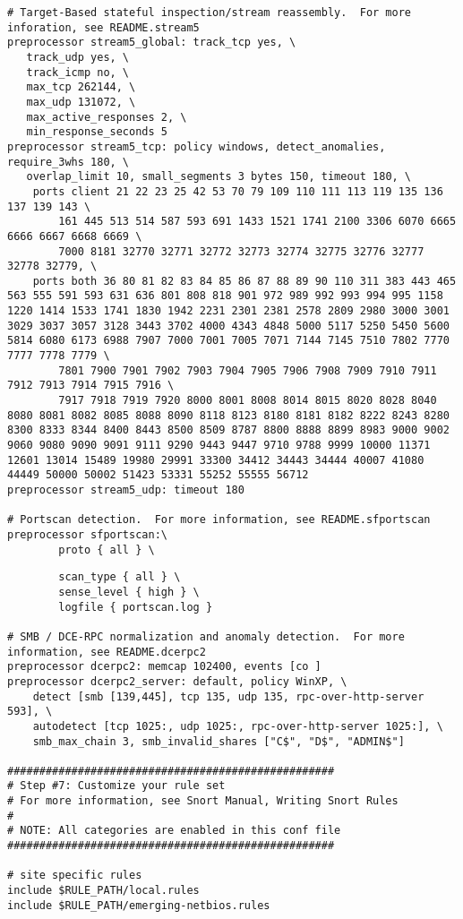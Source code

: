 \begin{lstlisting}
# Target-Based stateful inspection/stream reassembly.  For more inforation, see README.stream5
preprocessor stream5_global: track_tcp yes, \
   track_udp yes, \
   track_icmp no, \ 
   max_tcp 262144, \
   max_udp 131072, \
   max_active_responses 2, \
   min_response_seconds 5
preprocessor stream5_tcp: policy windows, detect_anomalies, require_3whs 180, \
   overlap_limit 10, small_segments 3 bytes 150, timeout 180, \
    ports client 21 22 23 25 42 53 70 79 109 110 111 113 119 135 136 137 139 143 \
        161 445 513 514 587 593 691 1433 1521 1741 2100 3306 6070 6665 6666 6667 6668 6669 \
        7000 8181 32770 32771 32772 32773 32774 32775 32776 32777 32778 32779, \
    ports both 36 80 81 82 83 84 85 86 87 88 89 90 110 311 383 443 465 563 555 591 593 631 636 801 808 818 901 972 989 992 993 994 995 1158 1220 1414 1533 1741 1830 1942 2231 2301 2381 2578 2809 2980 3000 3001 3029 3037 3057 3128 3443 3702 4000 4343 4848 5000 5117 5250 5450 5600 5814 6080 6173 6988 7907 7000 7001 7005 7071 7144 7145 7510 7802 7770 7777 7778 7779 \
        7801 7900 7901 7902 7903 7904 7905 7906 7908 7909 7910 7911 7912 7913 7914 7915 7916 \
        7917 7918 7919 7920 8000 8001 8008 8014 8015 8020 8028 8040 8080 8081 8082 8085 8088 8090 8118 8123 8180 8181 8182 8222 8243 8280 8300 8333 8344 8400 8443 8500 8509 8787 8800 8888 8899 8983 9000 9002 9060 9080 9090 9091 9111 9290 9443 9447 9710 9788 9999 10000 11371 12601 13014 15489 19980 29991 33300 34412 34443 34444 40007 41080 44449 50000 50002 51423 53331 55252 55555 56712
preprocessor stream5_udp: timeout 180

# Portscan detection.  For more information, see README.sfportscan
preprocessor sfportscan:\
        proto { all } \
\end{lstlisting}

\begin{lstlisting}
        scan_type { all } \
        sense_level { high } \  
        logfile { portscan.log }

# SMB / DCE-RPC normalization and anomaly detection.  For more information, see README.dcerpc2
preprocessor dcerpc2: memcap 102400, events [co ]
preprocessor dcerpc2_server: default, policy WinXP, \
    detect [smb [139,445], tcp 135, udp 135, rpc-over-http-server 593], \
    autodetect [tcp 1025:, udp 1025:, rpc-over-http-server 1025:], \
    smb_max_chain 3, smb_invalid_shares ["C$", "D$", "ADMIN$"]

###################################################
# Step #7: Customize your rule set
# For more information, see Snort Manual, Writing Snort Rules
#
# NOTE: All categories are enabled in this conf file
###################################################

# site specific rules
include $RULE_PATH/local.rules
include $RULE_PATH/emerging-netbios.rules
\end{lstlisting}

